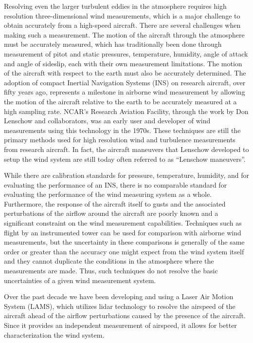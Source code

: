 \documentclass[12pt,twoside,english]{article}\usepackage[]{graphicx}\usepackage[]{color}
\begin{document}
Resolving even the larger turbulent eddies in the atmosphere requires
high resolution three-dimensional wind measurements, which is a major
challenge to obtain accurately from a high-speed aircraft. There
are several challenges when making such a measurement. The motion of
the aircraft through the atmosphere must be accurately measured, which
has traditionally been done through measurement of pitot and static
pressures, temperature, humidity, angle of attack and angle of
sideslip, each with their own measurement limitations. The motion
of the aircraft with respect to the earth must also be accurately
determined. The adoption of compact Inertial Navigation Systems
(INS) on research aircraft, over fifty years ago, represents a
milestone in airborne wind measurement by allowing the motion of the
aircraft relative to the earth to be accurately measured at a high
sampling rate. NCAR{\textquoteright}s Research Aviation Facility,
through the work by Don Lenschow and collaborators, was an early user
and developer of wind measurements using this technology in the 1970s.
These techniques are still the primary methods used for high
resolution wind and turbulence measurements from research aircraft.
In fact, the aircraft maneuvers that Lenschow developed to setup
the wind system are still today often referred to as
{\textquotedblleft}Lenschow maneuvers{\textquotedblright}. 

While there are calibration standards for pressure, temperature,
humidity, and for evaluating the performance of an INS, there is no
comparable standard for evaluating the performance of the wind
measuring system as a whole. Furthermore, the response of the
aircraft itself to gusts and the associated perturbations of the
airflow around the aircraft are poorly known and a significant
constraint on the wind measurement capabilities. Techniques such as
flight by an instrumented tower can be used for comparison with
airborne wind measurements, but the uncertainty in these comparisons is
generally of the same order or greater than the accuracy one might
expect from the wind system itself and they cannot duplicate the
conditions in the atmosphere where the measurements are made. Thus,
such techniques do not resolve the basic uncertainties of a given wind
measurement system. 

Over the past decade we have been developing and using a Laser Air
Motion System (LAMS), which utilizes lidar technology to resolve the
airspeed of the aircraft ahead of the airflow perturbations caused by
the presence of the aircraft. Since it provides an independent
measurement of airspeed, it allows for better characterization the wind
system. 
\end{document}
